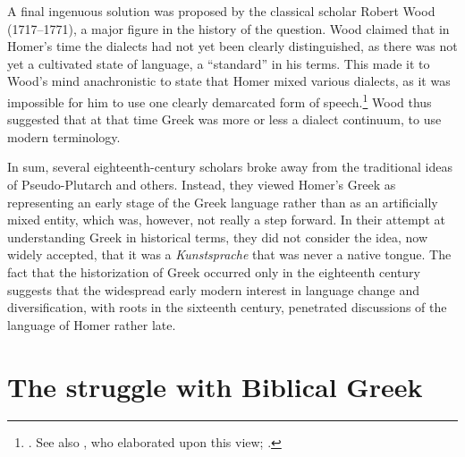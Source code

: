 A final ingenuous solution was proposed by the  classical scholar Robert Wood (1717–1771), a major figure in the history of the  question. Wood claimed that in Homer’s time the dialects had not yet been clearly distinguished, as there was not yet a cultivated state of language, a “standard” in his terms. This made it to Wood’s mind anachronistic to state that Homer mixed various dialects, as it was impossible for him to use one clearly demarcated form of speech.\footnote{\citet[238]{Wood1775}. See also \citet[\textsc{xxiiii–xxv}]{Harles1778}, who elaborated upon this view; \citet[\textsc{v}]{Facius1782}.} Wood thus suggested that at that time Greek was more or less a dialect continuum, to use modern terminology.

In sum, several eighteenth-century scholars broke away from the traditional ideas of Pseudo-Plutarch and others. Instead, they viewed Homer’s Greek as representing an early stage of the Greek language rather than as an artificially mixed entity, which was, however, not really a step forward. In their attempt at understanding  Greek in historical terms, they did not consider the idea, now widely accepted, that it was a \textit{Kunstsprache} that was never a native tongue. The fact that the historization of  Greek occurred only in the eighteenth century suggests that the widespread early modern interest in language change and diversification, with roots in the sixteenth century, penetrated discussions of the language of Homer rather late.

\section{The struggle with Biblical Greek}\label{sec:4.4}

